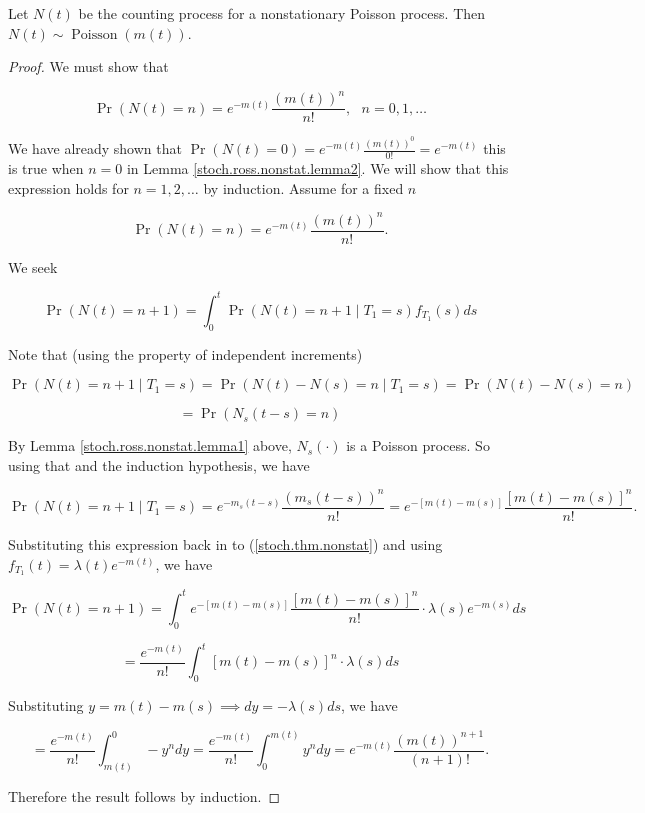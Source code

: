 \begin{theorem}\label{stoch.ross.nonstat.dist} Let \(N(t)\) be the counting process for a nonstationary Poisson process. Then \(N(t) \sim \operatorname{Poisson}(m(t))\).

\end{theorem}

\begin{proof} We must show that 

\[
\Pr(N(t) = n) = e^{-m(t)}  \frac{(m(t))^n}{n!}, \ \ \ n = 0, 1, \ldots
\]

We have already shown that \(\Pr(N(t) = 0) = e^{-m(t)}   \frac{(m(t))^0}{0!} = e^{-m(t)} \)  this is true when \(n=0\) in Lemma \ref{stoch.ross.nonstat.lemma2}. We will show that this expression holds for \(n=1, 2, \ldots\) by induction. Assume for a fixed \(n\)

\[
\Pr(N(t) = n) = e^{-m(t)}  \frac{(m(t))^n}{n!}.
\]

We seek 

\begin{equation}\label{stoch.thm.nonstat}
\Pr(N(t) = n+ 1) = \int_0^t \Pr(N(t) = n+1 \mid T_1 =s) f_{T_1}(s) ds
\end{equation}

Note that (using the property of independent increments)

\[
\Pr(N(t) = n+1 \mid T_1=s) = \Pr(N(t) - N(s) = n \mid T_1 =s) = \Pr(N(t) - N(s) = n) 
\]

\[
 = \Pr(N_s(t-s) = n) 
\]

By Lemma \ref{stoch.ross.nonstat.lemma1} above, \(N_s(\cdot)\) is a Poisson process. So using that and the induction hypothesis, we have

\[
\Pr(N(t) = n+1 \mid T_1=s) =e^{-m_s(t-s)} \frac{(m_s(t-s))^n}{n!} =  e^{-[m(t) -m(s)]} \frac{[m(t) - m(s)]^n}{n!} .
\]

Substituting this expression back in to (\ref{stoch.thm.nonstat}) and using \(f_{T_1}(t) = \lambda(t) e^{-m(t)}\), we have

\[
\Pr(N(t) = n+ 1) = \int_0^t e^{-[m(t) -m(s)]} \frac{[m(t) - m(s)]^n}{n!}  \cdot   \lambda(s) e^{-m(s)} ds
\]

\[
= \frac{e^{-m(t)}}{n!} \int_0^t [m(t) - m(s)]^n \cdot   \lambda(s)  ds
\]

Substituting \(y=m(t) - m(s) \implies dy = -\lambda(s) ds\), we have

\[
= \frac{e^{-m(t)}}{n!} \int_{m(t)}^{0} -y^n    dy  = \frac{e^{-m(t)}}{n!} \int_0^{m(t)} y^n    dy = e^{-m(t)}  \frac{(m(t))^{n+1}}{(n+1)!}.
\]

Therefore the result follows by induction.
\end{proof}


